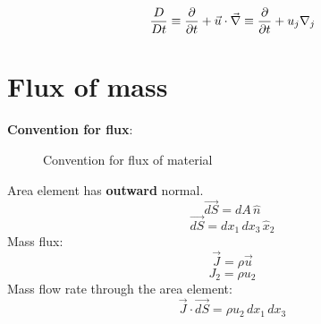 $$ {D \over D t} \equiv {\partial \over \partial t} + \vec{u} \cdot \vec{\nabla} \equiv {\partial \over \partial t} + u_j \nabla_j $$


\section{Flux of mass}

{\bf Convention for flux}:

\begin{figure}[h]
\begin{center}
\end{center}
\caption{Convention for flux of material}
\label{FluxConvention}
\end{figure}


Area element has {\bf outward} normal.
$$ \vec{dS} = dA \, \hat{n} $$
$$ \vec{dS} = dx_1 \, dx_3 \, \hat{x}_2 $$
Mass flux:
$$ \vec{J} = \rho \vec{u} $$
$$ J_2 = \rho u_2 $$
Mass flow rate through the area element:
$$ \vec{J} \cdot \vec{dS} = \rho u_2 \, dx_1 \, dx_3 $$

